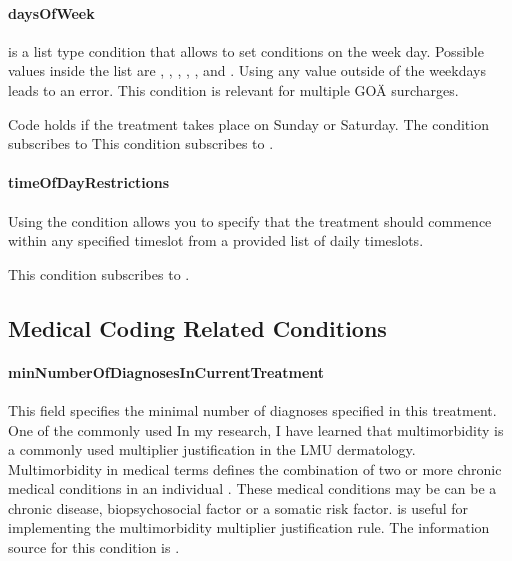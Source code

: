 \paragraph{daysOfWeek}
 is a list type condition that allows to set conditions on the week day.
Possible values inside the list are , , , , ,  and .
Using any value outside of the weekdays leads to an error.
This condition is relevant for multiple GOÄ surcharges.

Code  holds if the treatment takes place on Sunday or Saturday.
The  condition subscribes to 
This condition subscribes to .

\paragraph{timeOfDayRestrictions}
Using the  condition allows you to specify that the treatment should commence within any specified timeslot from a provided list of daily timeslots.

This condition subscribes to .

\subsection{Medical Coding Related Conditions}

\paragraph{minNumberOfDiagnosesInCurrentTreatment}
This field specifies the minimal number of diagnoses specified in this treatment.
One of the commonly used
In my research, I have learned that multimorbidity is a commonly used multiplier justification in the LMU dermatology.
Multimorbidity in medical terms defines the combination of two or more chronic medical conditions in an individual \cite{Reste2013The}.
These medical conditions may be can be a chronic disease, biopsychosocial factor or a somatic risk factor.
 is useful for implementing the multimorbidity multiplier justification rule.
The information source for this condition is .


